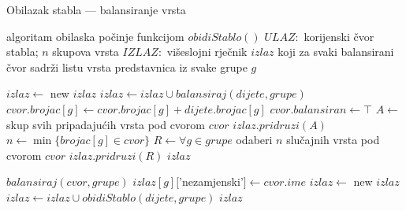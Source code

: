 \begin{algorithm}[h!]

\centering
\caption{Obilazak stabla --- balansiranje vrsta}
\label{algo:balance}

\begin{algorithmic}[1]

\State algoritam obilaska počinje funkcijom $obidiStablo()$
\State $ULAZ:$ korijenski čvor stabla; $n$ skupova vrsta
\State $IZLAZ:$ višeslojni rječnik $izlaz$ koji za svaki balansirani čvor sadrži
listu vrsta predstavnica iz svake grupe $g$  

    \State $izlaz \gets$ new $izlaz$
        \State $izlaz \gets izlaz \cup balansiraj(dijete, grupe)$
                \State $cvor.brojac[g] \gets cvor.brojac[g] + dijete.brojac[g]$
            \EndFor
        \EndIf
    \EndFor
        \State $cvor.balansiran \gets \top$
            \State $A \gets$ skup svih pripadajućih vrsta pod cvorom $cvor$
            \State $izlaz.pridruzi(A)$
        \Else
            \State $n \gets \min\{brojac[g] \in cvor\}$
            \State $R \gets \forall g \in grupe$ odaberi $n$ slučajnih vrsta pod
cvorom $cvor$
            \State $izlaz.pridruzi(R)$
        \EndIf
    \EndIf
    \State \Return $izlaz$
\EndFunction

\end{algorithmic}
\end{algorithm}

\begin{algorithm}[h!]
\begin{algorithmic}[1]

        \State \Return $balansiraj(cvor, grupe)$
    \Else
                \State $izlaz[g][$'nezamjenski'$] \gets cvor.ime$
            \EndFor
        \Else
            \State $izlaz \gets$ new $izlaz$
                    \State $izlaz \gets izlaz \cup obidiStablo(dijete, grupe)$
                \EndIf
            \EndFor
        \EndIf
    \EndIf
    \State \Return $izlaz$
\EndFunction

\end{algorithmic}
\end{algorithm}  
